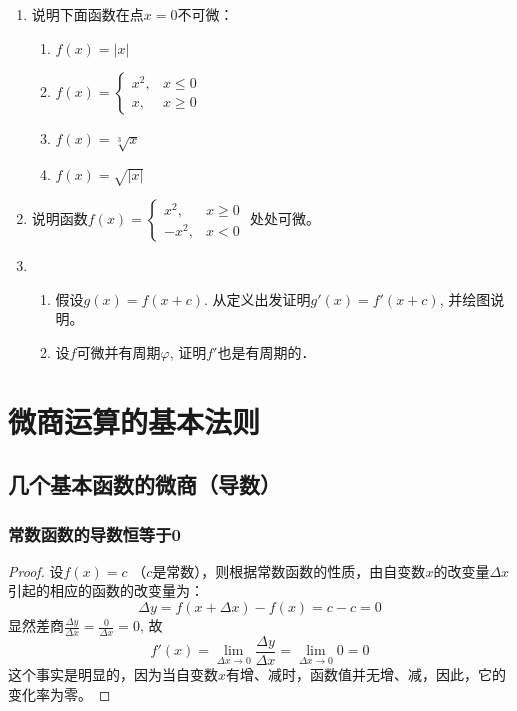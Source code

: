 \begin{ex}
\begin{enumerate}
    \item 说明下面函数在点$x=0$不可微：
\begin{multicols}{2}
\begin{enumerate}
    \item $f(x)=|x|$
    \item $f(x)=\begin{cases}
        x^2,& x\le 0\\
        x,& x\ge 0
    \end{cases}$
    \item $f(x)=\sqrt[3]{x}$
    \item $f(x)=\sqrt{|x|}$
\end{enumerate}
\end{multicols}
\item 说明函数$f(x)=\begin{cases}
    x^2,& x\ge 0\\
    -x^2,& x<0
\end{cases}$
    处处可微。
\item \begin{enumerate}
\item 假设$g(x)=f(x+c)$. 从定义出发证明$g'(x)=f'(x+c)$, 并绘图说明。    
\item 设$f$可微并有周期$\varphi$, 证明$f'$也是有周期的．
\end{enumerate}

\end{enumerate}
\end{ex}

\section{微商运算的基本法则}
\subsection{几个基本函数的微商（导数）}
\subsubsection{常数函数的导数恒等于0}

\begin{proof}
设$f(x)=c$ （$c$是常数），则根据常数函数的性质，由自变数$x$的改变量$\Delta x$引起的相应的函数的改变量为：
\[\Delta y=f (x+\Delta x) -f (x)=c-c=0\]
显然差商$\frac{\Delta y}{\Delta x}=\frac{0}{\Delta x}=0$, 故
\[f' (x) =\lim_{\Delta x\to 0}\frac{\Delta y}{\Delta x}=
\lim_{\Delta x\to 0} 0=0\]
这个事实是明显的，因为当自变数$x$有增、减时，函数值并无增、减，因此，它的变化率为零。
\end{proof}

